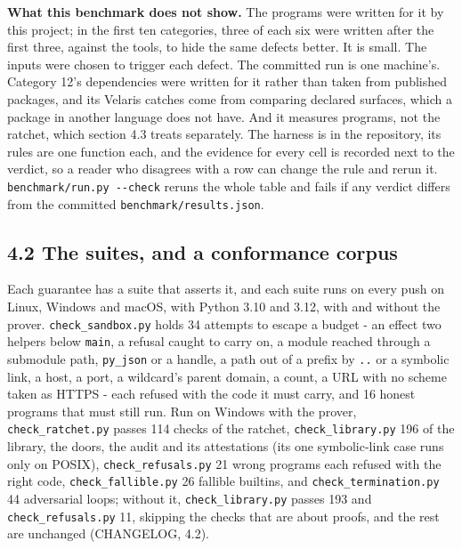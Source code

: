 \documentclass[
]{article}
\begin{document}
\textbf{What this benchmark does not show.} The programs were written
for it by this project; in the first ten categories, three of each six
were written after the first three, against the tools, to hide the same
defects better. It is small. The inputs were chosen to trigger each
defect. The committed run is one machine's. Category 12's dependencies
were written for it rather than taken from published packages, and its
Velaris catches come from comparing declared surfaces, which a package
in another language does not have. And it measures programs, not the
ratchet, which section 4.3 treats separately. The harness is in the
repository, its rules are one function each, and the evidence for every
cell is recorded next to the verdict, so a reader who disagrees with a
row can change the rule and rerun it.
\texttt{benchmark/run.py\ -\/-check} reruns the whole table and fails if
any verdict differs from the committed \texttt{benchmark/results.json}.

\subsection{4.2 The suites, and a conformance
corpus}\label{the-suites-and-a-conformance-corpus}

Each guarantee has a suite that asserts it, and each suite runs on every
push on Linux, Windows and macOS, with Python 3.10 and 3.12, with and
without the prover. \texttt{check\_sandbox.py} holds 34 attempts to
escape a budget - an effect two helpers below \texttt{main}, a refusal
caught to carry on, a module reached through a submodule path,
\texttt{py\_json} or a handle, a path out of a prefix by \texttt{..} or
a symbolic link, a host, a port, a wildcard's parent domain, a count, a
URL with no scheme taken as HTTPS - each refused with the code it must
carry, and 16 honest programs that must still run. Run on Windows with
the prover, \texttt{check\_ratchet.py} passes 114 checks of the ratchet,
\texttt{check\_library.py} 196 of the library, the doors, the audit and
its attestations (its one symbolic-link case runs only on POSIX),
\texttt{check\_refusals.py} 21 wrong programs each refused with the
right code, \texttt{check\_fallible.py} 26 fallible builtins, and
\texttt{check\_termination.py} 44 adversarial loops; without it,
\texttt{check\_library.py} passes 193 and \texttt{check\_refusals.py}
11, skipping the checks that are about proofs, and the rest are
unchanged (CHANGELOG, 4.2).
\end{document}
